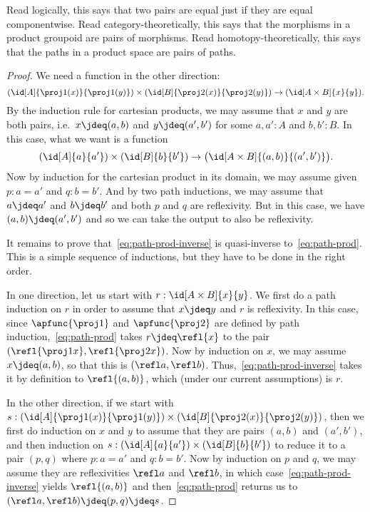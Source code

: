 Read logically, this says that two pairs are equal just if they are equal
componentwise.  Read category-theoretically, this says that the
morphisms in a product groupoid are pairs of morphisms.  Read
homotopy-theoretically, this says that the paths in a product
space are pairs of paths.

\begin{proof}
  We need a function in the other direction:
  \begin{equation}
    (\id[A]{\proj1(x)}{\proj1(y)}) \times (\id[B]{\proj2(x)}{\proj2(y)}) \to (\id[A\times B]{x}{y}). \label{eq:path-prod-inverse}
  \end{equation}
  By the induction rule for cartesian products, we may assume that $x$ and $y$ are both pairs, i.e.\ $x\jdeq (a,b)$ and $y\jdeq (a',b')$ for some $a,a':A$ and $b,b':B$.
  In this case, what we want is a function
  \begin{equation*}
    (\id[A]{a}{a'}) \times (\id[B]{b}{b'}) \to \big(\id[A\times B]{(a,b)}{(a',b')}\big).
  \end{equation*}
  Now by induction for the cartesian product in its domain, we may assume given $p:a=a'$ and $q:b=b'$.
  And by two path inductions, we may assume that $a\jdeq a'$ and $b\jdeq b'$ and both $p$ and $q$ are reflexivity.
  But in this case, we have $(a,b)\jdeq(a',b')$ and so we can take the output to also be reflexivity.

  It remains to prove that~\eqref{eq:path-prod-inverse} is quasi-inverse to~\eqref{eq:path-prod}.
  This is a simple sequence of inductions, but they have to be done in the right order.

  In one direction, let us start with $r:\id[A\times B]{x}{y}$.
  We first do a path induction on $r$ in order to assume that $x\jdeq y$ and $r$ is reflexivity.
  In this case, since $\apfunc{\proj1}$ and $\apfunc{\proj2}$ are defined by path induction,~\eqref{eq:path-prod} takes $r\jdeq \refl{x}$ to the pair $(\refl{\proj1x},\refl{\proj2x})$.
  Now by induction on $x$, we may assume $x\jdeq (a,b)$, so that this is $(\refl a, \refl b)$.
  Thus,~\eqref{eq:path-prod-inverse} takes it by definition to $\refl{(a,b)}$, which (under our current assumptions) is $r$.

  In the other direction, if we start with $s:(\id[A]{\proj1(x)}{\proj1(y)}) \times (\id[B]{\proj2(x)}{\proj2(y)})$, then we first do induction on $x$ and $y$ to assume that they are pairs $(a,b)$ and $(a',b')$, and then induction on $s:(\id[A]{a}{a'}) \times (\id[B]{b}{b'})$ to reduce it to a pair $(p,q)$ where $p:a=a'$ and $q:b=b'$.
  Now by induction on $p$ and $q$, we may assume they are reflexivities $\refl a$ and $\refl b$, in which case~\eqref{eq:path-prod-inverse} yields $\refl{(a,b)}$ and then~\eqref{eq:path-prod} returns us to $(\refl a,\refl b)\jdeq (p,q)\jdeq s$.
\end{proof}

